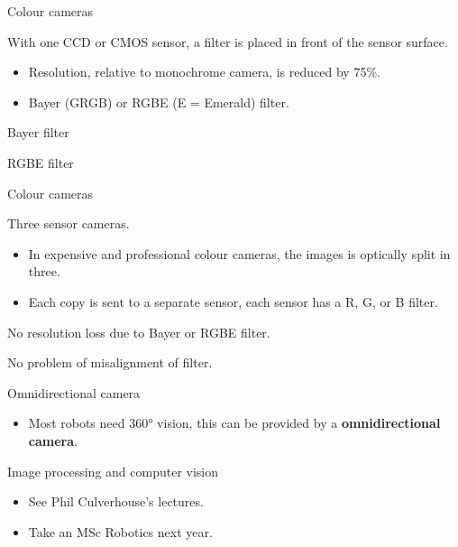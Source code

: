 \documentclass[compress]{beamer}
\begin{document}
\begin{frame}{Colour cameras}

With one CCD or CMOS sensor, a filter is placed in front of the sensor
surface.

\begin{itemize}

\item
  Resolution, relative to monochrome camera, is reduced by 75\%.
\item
  Bayer (GRGB) or RGBE (E = Emerald) filter.
\end{itemize}

Bayer filter

\end{frame}

\begin{frame}{RGBE filter}

\end{frame}

\begin{frame}{Colour cameras}

Three sensor cameras.

\begin{itemize}

\item
  In expensive and professional colour cameras, the images is optically
  split in three.
\item
  Each copy is sent to a separate sensor, each sensor has a R, G, or B
  filter.
\end{itemize}

No resolution loss due to Bayer or RGBE filter.

No problem of misalignment of filter.

\end{frame}

\begin{frame}{Omnidirectional camera}

\begin{itemize}

\item
  Most robots need 360° vision, this can be provided by a
  \textbf{omnidirectional camera}.
\end{itemize}

\end{frame}

\begin{frame}{Image processing and computer vision}

\begin{itemize}

\item
  See Phil Culverhouse's lectures.
\item
  Take an MSc Robotics next year.
\end{itemize}

\end{frame}
\end{document}
